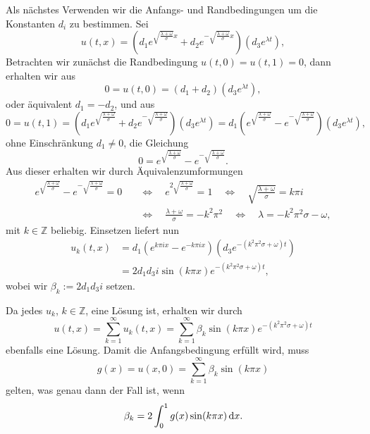 Als nächstes Verwenden wir die Anfangs- und Randbedingungen um die Konstanten $d_{i}$ zu bestimmen.
Sei
\begin{equation}
    u(t, x) = \left( d_{1} e^{\sqrt{\frac{\lambda + \omega}{\sigma}} x} + d_{2} e^{-\sqrt{\frac{\lambda + \omega}{\sigma}}x} \right) \left( d_{3} e^{\lambda t} \right),
\end{equation}
Betrachten wir zunächst die Randbedingung $u(t, 0) = u(t, 1) = 0$, dann erhalten wir aus
\begin{equation}
    0 = u(t, 0) = \left( d_{1} + d_{2} \right) \left( d_{3} e^{\lambda t} \right),
\end{equation}
oder äquivalent $d_{1} = - d_{2}$, und aus
\begin{equation}
    0 = u(t, 1) = \left( d_{1} e^{\sqrt{\frac{\lambda + \omega}{\sigma}}} + d_{2} e^{-\sqrt{\frac{\lambda + \omega}{\sigma}}} \right) \left( d_{3} e^{\lambda t} \right) =
    d_{1} \left( e^{\sqrt{\frac{\lambda + \omega}{\sigma}}} - e^{-\sqrt{\frac{\lambda + \omega}{\sigma}}} \right) \left( d_{3} e^{\lambda t} \right),
\end{equation}
ohne Einschränkung $d_{1} \neq 0$, die Gleichung
\begin{equation}
    0 = e^{\sqrt{\frac{\lambda + \omega}{\sigma}}} - e^{-\sqrt{\frac{\lambda + \omega}{\sigma}}}.
\end{equation}
Aus dieser erhalten wir durch Äquivalenzumformungen
\begin{align}
    e^{\sqrt{\frac{\lambda + \omega}{\sigma}}} - e^{-\sqrt{\frac{\lambda + \omega}{\sigma}}} = 0
    &\quad \iff \quad
    e^{2\sqrt{\frac{\lambda + \omega}{\sigma}}} = 1
    \quad \iff \quad
    \sqrt{\tfrac{\lambda + \omega}{\sigma}} = k \pi i
    \\&\quad \iff \quad
    \tfrac{\lambda + \omega}{\sigma} = -k^2 \pi^2
    \quad \iff \quad
    \lambda = -k^2 \pi^2 \sigma - \omega,
\end{align}
mit $k \in \mathbb{Z}$ beliebig.
Einsetzen liefert nun
\begin{align}
    u_{k}(t, x) &= d_{1} \left( e^{k \pi i x} - e^{-k \pi i x} \right) \left( d_{3} e^{- (k^2 \pi^2 \sigma + \omega) t} \right)
    \\&= 2 d_{1} d_{3} i \sin(k \pi x) e^{-(k^2 \pi^2 \sigma + \omega)t},
\end{align}
wobei wir $\beta_{k} := 2 d_{1} d_{3} i$ setzen.

Da jedes $u_{k}$, $k \in \mathbb{Z}$, eine Lösung ist, erhalten wir durch
\begin{equation}
    u(t, x) = \sum_{k = 1}^{\infty} u_{k}(t, x) = \sum_{k = 1}^{\infty} \beta_{k} \sin(k \pi x) e^{-(k^2 \pi^2 \sigma + \omega)t}
\end{equation}
ebenfalls eine Lösung.
Damit die Anfangsbedingung erfüllt wird, muss
\begin{equation}
    g(x) = u(x, 0) = \sum_{k = 1}^{\infty} \beta_{k} \sin(k \pi x)
\end{equation}
gelten, was genau dann der Fall ist, wenn
\begin{equation}
    \beta_{k} = 2 \int_{0}^{1} g(x) \sin(k \pi x) \mathop{}\!\mathrm{d} x.
\end{equation}

